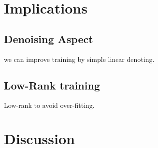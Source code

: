 \documentclass{article}
\begin{document}
\section{Implications} 

\subsection{Denoising Aspect}
we can improve training by simple linear denoting.

\subsection{Low-Rank training}
Low-rank to avoid over-fitting.


\section{Discussion}
\end{document}
